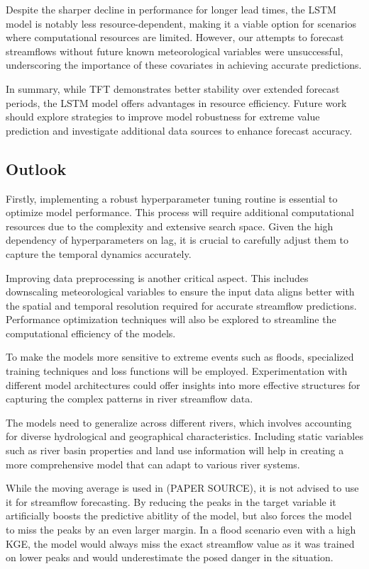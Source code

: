 \documentclass[
]{article}
\begin{document}
Despite the sharper decline in performance for longer lead times, the
LSTM model is notably less resource-dependent, making it a viable option
for scenarios where computational resources are limited. However, our
attempts to forecast streamflows without future known meteorological
variables were unsuccessful, underscoring the importance of these
covariates in achieving accurate predictions.

In summary, while TFT demonstrates better stability over extended
forecast periods, the LSTM model offers advantages in resource
efficiency. Future work should explore strategies to improve model
robustness for extreme value prediction and investigate additional data
sources to enhance forecast accuracy.

\hypertarget{outlook}{%
\subsection{Outlook}\label{outlook}}

Firstly, implementing a robust hyperparameter tuning routine is
essential to optimize model performance. This process will require
additional computational resources due to the complexity and extensive
search space. Given the high dependency of hyperparameters on lag, it is
crucial to carefully adjust them to capture the temporal dynamics
accurately.

Improving data preprocessing is another critical aspect. This includes
downscaling meteorological variables to ensure the input data aligns
better with the spatial and temporal resolution required for accurate
streamflow predictions. Performance optimization techniques will also be
explored to streamline the computational efficiency of the models.

To make the models more sensitive to extreme events such as floods,
specialized training techniques and loss functions will be employed.
Experimentation with different model architectures could offer insights
into more effective structures for capturing the complex patterns in
river streamflow data.

The models need to generalize across different rivers, which involves
accounting for diverse hydrological and geographical characteristics.
Including static variables such as river basin properties and land use
information will help in creating a more comprehensive model that can
adapt to various river systems.

While the moving average is used in (PAPER SOURCE), it is not advised to
use it for streamflow forecasting. By reducing the peaks in the target
variable it artificially boosts the predictive abitlity of the model,
but also forces the model to miss the peaks by an even larger margin. In
a flood scenario even with a high KGE, the model would always miss the
exact streamflow value as it was trained on lower peaks and would
underestimate the posed danger in the situation.
\end{document}
